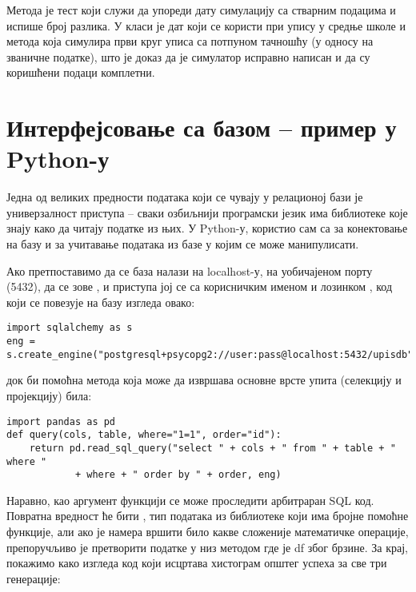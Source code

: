 Метода  је тест који служи да упореди дату симулацију са стварним подацима и испише број разлика. У класи  је дат  који се користи при упису у средње школе и  метода која симулира први круг уписа са потпуном тачношћу (у односу на званичне податке), што је доказ да је симулатор исправно написан и да су коришћени подаци комплетни.


\section{Интерфејсовање са базом -- пример у Python-у}

Једна од великих предности података који се чувају у релационој бази је универзалност приступа -- сваки озбиљнији програмски језик има библиотеке које знају како да читају податке из њих. У Python-у, користио сам  са  за конектовање на базу и  за учитавање података из базе у  којим се може манипулисати.

Ако претпоставимо да се база налази на localhost-у, на уобичајеном порту (5432), да се зове , и приступа јој се са корисничким именом  и лозинком , код који се повезује на базу изгледа овако:
\begin{verbatim}
import sqlalchemy as s
eng = s.create_engine("postgresql+psycopg2://user:pass@localhost:5432/upisdb")
\end{verbatim}

док би помоћна метода која може да извршава основне врсте упита (селекцију и пројекцију) била:

\begin{verbatim}
import pandas as pd
def query(cols, table, where="1=1", order="id"):
    return pd.read_sql_query("select " + cols + " from " + table + " where " 
            + where + " order by " + order, eng)
\end{verbatim}

Наравно, као аргумент  функцији се може проследити арбитраран SQL код. Повратна вредност ће бити , тип података из  библиотеке који има бројне помоћне функције, али ако је намера вршити било какве сложеније математичке операције, препоручљиво је претворити податке у  низ методом  где је df  због брзине. За крај, покажимо како изгледа код који исцртава хистограм општег успеха за све три генерације:

